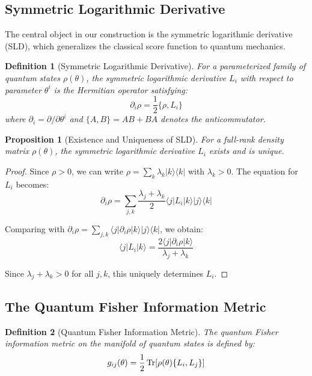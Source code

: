 \documentclass[12pt,a4paper]{article}
\newtheorem{definition}{Definition}
\newtheorem{proposition}{Proposition}
\begin{document}
\subsection{Symmetric Logarithmic Derivative}

The central object in our construction is the symmetric logarithmic derivative (SLD), which generalizes the classical score function to quantum mechanics.

\begin{definition}[Symmetric Logarithmic Derivative]
For a parameterized family of quantum states $\rho(\theta)$, the symmetric logarithmic derivative $L_i$ with respect to parameter $\theta^i$ is the Hermitian operator satisfying:
\begin{equation}
\partial_i \rho = \frac{1}{2}\{\rho, L_i\}
\end{equation}
where $\partial_i = \partial/\partial\theta^i$ and $\{A,B\} = AB + BA$ denotes the anticommutator.
\end{definition}

\begin{proposition}[Existence and Uniqueness of SLD]
For a full-rank density matrix $\rho(\theta)$, the symmetric logarithmic derivative $L_i$ exists and is unique.
\end{proposition}

\begin{proof}
Since $\rho > 0$, we can write $\rho = \sum_k \lambda_k |k\rangle\langle k|$ with $\lambda_k > 0$. The equation for $L_i$ becomes:
\begin{equation}
\partial_i \rho = \sum_{j,k} \frac{\lambda_j + \lambda_k}{2} \langle j|L_i|k\rangle |j\rangle\langle k|
\end{equation}

Comparing with $\partial_i \rho = \sum_{j,k} \langle j|\partial_i\rho|k\rangle |j\rangle\langle k|$, we obtain:
\begin{equation}
\langle j|L_i|k\rangle = \frac{2\langle j|\partial_i\rho|k\rangle}{\lambda_j + \lambda_k}
\end{equation}

Since $\lambda_j + \lambda_k > 0$ for all $j,k$, this uniquely determines $L_i$.
\end{proof}

\subsection{The Quantum Fisher Information Metric}

\begin{definition}[Quantum Fisher Information Metric]
The quantum Fisher information metric on the manifold of quantum states is defined by:
\begin{equation}
g_{ij}(\theta) = \frac{1}{2}\Tr[\rho(\theta)\{L_i, L_j\}]
\end{equation}
\end{definition}
\end{document}
